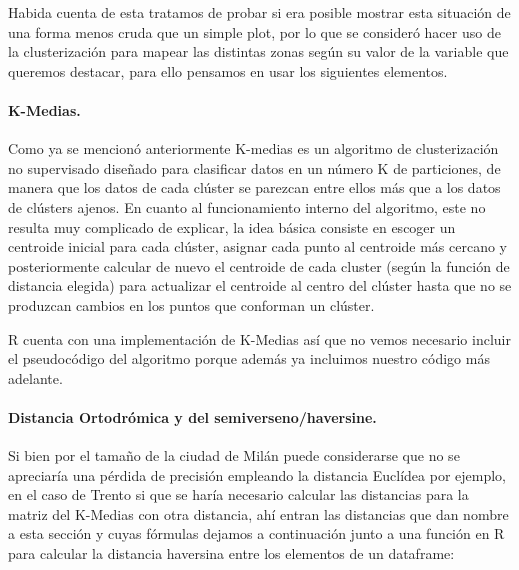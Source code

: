 \documentclass[11pt, a4paper]{article} %
\begin{document}
Habida cuenta de esta tratamos de probar si era posible mostrar esta situación de una forma menos cruda que un simple plot, por lo que se consideró hacer uso de la clusterización para mapear las distintas zonas según su valor de la variable que queremos destacar, para ello pensamos en usar los siguientes elementos.
\paragraph{K-Medias.}
Como ya se mencionó anteriormente K-medias es un algoritmo de clusterización no supervisado diseñado para clasificar datos en un número K de particiones, de manera que los datos de cada clúster se parezcan entre ellos más que a los datos de clústers ajenos. En cuanto al funcionamiento interno del algoritmo, este no resulta muy complicado de explicar, la idea básica consiste en escoger un centroide inicial para cada clúster, asignar cada punto al centroide más cercano y posteriormente calcular de nuevo el centroide de cada cluster (según la función de distancia elegida) para actualizar el centroide al centro del clúster hasta que no se produzcan cambios en los puntos que conforman un clúster. \cite{kmedias}


R cuenta con una implementación de K-Medias así que no vemos necesario incluir el pseudocódigo del algoritmo porque además ya incluimos nuestro código más adelante.
\paragraph{Distancia Ortodrómica y del semiverseno/haversine.} Si bien por el tamaño de la ciudad de Milán puede considerarse que no se apreciaría una pérdida de precisión empleando la distancia Euclídea por ejemplo, en el caso de Trento si que se haría necesario calcular las distancias para la matriz del K-Medias con otra distancia, ahí entran las distancias que dan nombre a esta sección y cuyas fórmulas dejamos a continuación junto a una función en R para calcular la distancia haversina entre los elementos de un dataframe: \cite{clusters1}
\end{document}
